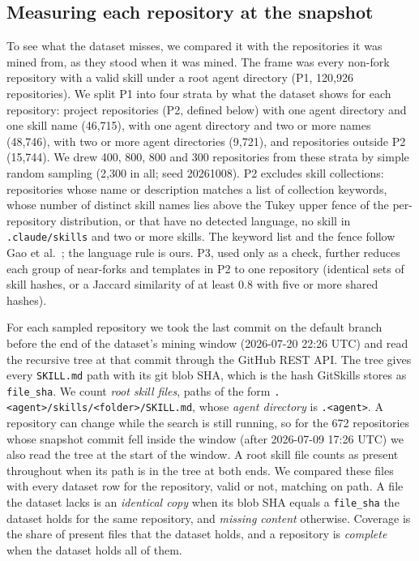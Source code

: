 
\subsection{Measuring each repository at the snapshot}
\label{sec:sample}

To see what the dataset misses, we compared it with the repositories it was mined from, as they stood when it was
mined. The frame was every non-fork repository with a valid skill under a root agent directory
(P1, 120,926 repositories). We split P1 into four strata by what the dataset shows for each repository: project
repositories (P2, defined below) with one agent directory and one skill name (46,715), with one agent directory and
two or more names (48,746), with two or more agent directories (9,721), and repositories outside P2 (15,744). We
drew 400, 800, 800 and 300 repositories from these strata by simple random sampling (2,300 in all; seed 20261008).
P2 excludes skill collections: repositories whose name or description matches a list of collection keywords, whose
number of distinct skill names lies above the Tukey upper fence of the per-repository distribution, or that have no
detected language, no skill in \texttt{.claude/skills} and two or more skills. The keyword list and the fence follow Gao et al.~\cite{gao2026registry}; the language rule is ours. P3, used only as a check, further reduces each group of
near-forks and templates in P2 to one repository (identical sets of skill hashes, or a Jaccard similarity of at least
0.8 with five or more shared hashes).

For each sampled repository we took the last commit on the default branch before the end of the dataset's mining
window (2026-07-20 22:26 UTC) and read the recursive tree at that commit through the GitHub REST API. The tree gives
every \texttt{SKILL.md} path with its git blob SHA, which is the hash GitSkills stores as \texttt{file\_sha}. We
count \emph{root skill files}, paths of the form \texttt{.<agent>/skills/<folder>/SKILL.md}, whose
\emph{agent directory} is \texttt{.<agent>}. A repository can change while the search is still running, so for the 672 repositories whose snapshot commit fell
inside the window (after 2026-07-09 17:26 UTC) we also read the tree at the start of the window. A root skill file counts as
present throughout when its path is in the tree at both ends. We compared these files with every dataset row for the
repository, valid or not, matching on path. A file the dataset lacks is an \emph{identical copy} when its blob SHA
equals a \texttt{file\_sha} the dataset holds for the same repository, and \emph{missing content} otherwise.
Coverage is the share of present files that the dataset holds, and a repository is \emph{complete} when the
dataset holds all of them.

